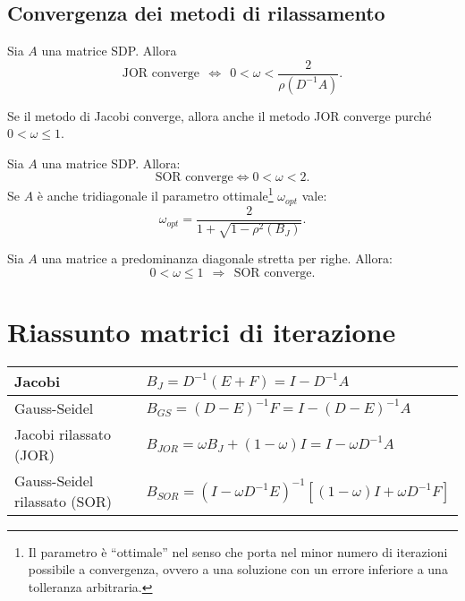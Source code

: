 \subsection{Convergenza dei metodi di rilassamento}
\spazioSecBox
\begin{theorem}
Sia $A$ una matrice SDP. Allora
\begin{equation*}
\text{JOR converge} \ \ \Leftrightarrow \ \ 0< \omega < \frac{2}{\rho \left( D^{-1} A\right)}.
\end{equation*}
\end{theorem}
\begin{theorem}
Se il metodo di Jacobi converge, allora anche il metodo JOR converge purché $0< \omega \leqslant 1$.
\end{theorem}
\begin{theorem}
Sia $A$ una matrice SDP. Allora:
\begin{equation*}
\text{SOR converge} \Leftrightarrow 0< \omega < 2.
\end{equation*}
Se $A$ è anche tridiagonale il parametro ottimale\footnote{Il parametro è ``ottimale'' nel senso che porta nel minor numero di iterazioni possibile a convergenza, ovvero a una soluzione con un errore inferiore a una tolleranza arbitraria.} $\omega _{opt}$ vale:
\begin{equation*}
\omega _{opt} =\frac{2}{1+\sqrt{1-\rho ^{2}( B_{J})}}.
\end{equation*}
\end{theorem}
\begin{theorem}
Sia $A$ una matrice a predominanza diagonale stretta per righe. Allora:
\begin{equation*}
0< \omega \leqslant 1\ \ \Rightarrow \ \ \text{SOR converge}.
\end{equation*}
\end{theorem}
\section{Riassunto matrici di iterazione}
\begin{table}[H]
  \def\arraystretch{1.5}
  \begin{tabular}{|l|l|}
    \hline
    Jacobi                       & $B_{J} =D^{-1}( E+F)=I-D^{-1}A$ \\ \hline
    Gauss-Seidel                 & $B_{GS} =( D-E)^{-1} F=I-(D-E)^{-1}A$ \\ \hline
    Jacobi rilassato (JOR)       & $B_{JOR} =\omega B_{J} +( 1-\omega ) I=I-\omega D^{-1} A$ \\ \hline
    Gauss-Seidel rilassato (SOR) & $B_{SOR} =\left( I-\omega D^{-1} E\right)^{-1}\left[( 1-\omega ) I+\omega D^{-1} F\right]$ \\ \hline
  \end{tabular}
\end{table}

